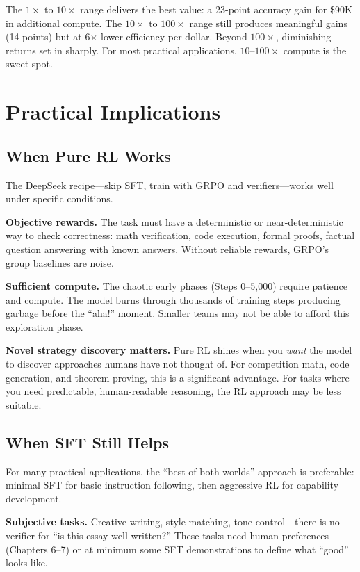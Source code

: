 \begin{chapterenv}
The $1\times$ to $10\times$ range delivers the best value: a 23-point accuracy gain for \$90K in additional compute. The $10\times$ to $100\times$ range still produces meaningful gains (14 points) but at 6$\times$ lower efficiency per dollar. Beyond $100\times$, diminishing returns set in sharply. For most practical applications, $10$--$100\times$ compute is the sweet spot.

\section{Practical Implications}

\subsection{When Pure RL Works}

The DeepSeek recipe---skip SFT, train with GRPO and verifiers---works well under specific conditions.

\textbf{Objective rewards.} The task must have a deterministic or near-deterministic way to check correctness: math verification, code execution, formal proofs, factual question answering with known answers. Without reliable rewards, GRPO's group baselines are noise.

\textbf{Sufficient compute.} The chaotic early phases (Steps 0--5,000) require patience and compute. The model burns through thousands of training steps producing garbage before the ``aha!'' moment. Smaller teams may not be able to afford this exploration phase.

\textbf{Novel strategy discovery matters.} Pure RL shines when you \textit{want} the model to discover approaches humans have not thought of. For competition math, code generation, and theorem proving, this is a significant advantage. For tasks where you need predictable, human-readable reasoning, the RL approach may be less suitable.

\subsection{When SFT Still Helps}

For many practical applications, the ``best of both worlds'' approach is preferable: minimal SFT for basic instruction following, then aggressive RL for capability development.

\textbf{Subjective tasks.} Creative writing, style matching, tone control---there is no verifier for ``is this essay well-written?'' These tasks need human preferences (Chapters 6--7) or at minimum some SFT demonstrations to define what ``good'' looks like.


\end{chapterenv}

